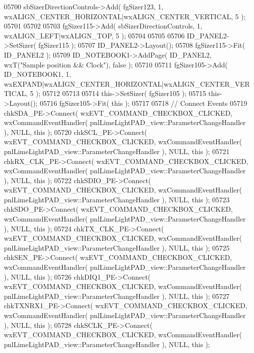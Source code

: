 \begin{DoxyCode}
05700     sbSizerDirectionControls->Add( fgSizer123, 1, wxALIGN\_CENTER\_HORIZONTAL|wxALIGN\_CENTER\_VERTICAL, 5 );
05701     
05702     
05703     fgSizer115->Add( sbSizerDirectionControls, 1, wxALIGN\_LEFT|wxALIGN\_TOP, 5 );
05704     
05705     
05706     ID_PANEL2->SetSizer( fgSizer115 );
05707     ID_PANEL2->Layout();
05708     fgSizer115->Fit( ID_PANEL2 );
05709     ID_NOTEBOOK1->AddPage( ID_PANEL2, wxT(\textcolor{stringliteral}{"Sample position && Clock"}), \textcolor{keyword}{false} );
05710     
05711     fgSizer105->Add( ID_NOTEBOOK1, 1, wxEXPAND|wxALIGN\_CENTER\_HORIZONTAL|wxALIGN\_CENTER\_VERTICAL, 5 );
05712     
05713     
05714     this->SetSizer( fgSizer105 );
05715     this->Layout();
05716     fgSizer105->Fit( \textcolor{keyword}{this} );
05717     
05718     \textcolor{comment}{// Connect Events}
05719     chkSDA_PE->Connect( wxEVT\_COMMAND\_CHECKBOX\_CLICKED, wxCommandEventHandler( 
      pnlLimeLightPAD_view::ParameterChangeHandler ), NULL, \textcolor{keyword}{this} );
05720     chkSCL_PE->Connect( wxEVT\_COMMAND\_CHECKBOX\_CLICKED, wxCommandEventHandler( 
      pnlLimeLightPAD_view::ParameterChangeHandler ), NULL, \textcolor{keyword}{this} );
05721     chkRX_CLK_PE->Connect( wxEVT\_COMMAND\_CHECKBOX\_CLICKED, wxCommandEventHandler( 
      pnlLimeLightPAD_view::ParameterChangeHandler ), NULL, \textcolor{keyword}{this} );
05722     chkSDIO_PE->Connect( wxEVT\_COMMAND\_CHECKBOX\_CLICKED, wxCommandEventHandler( 
      pnlLimeLightPAD_view::ParameterChangeHandler ), NULL, \textcolor{keyword}{this} );
05723     chkSDO_PE->Connect( wxEVT\_COMMAND\_CHECKBOX\_CLICKED, wxCommandEventHandler( 
      pnlLimeLightPAD_view::ParameterChangeHandler ), NULL, \textcolor{keyword}{this} );
05724     chkTX_CLK_PE->Connect( wxEVT\_COMMAND\_CHECKBOX\_CLICKED, wxCommandEventHandler( 
      pnlLimeLightPAD_view::ParameterChangeHandler ), NULL, \textcolor{keyword}{this} );
05725     chkSEN_PE->Connect( wxEVT\_COMMAND\_CHECKBOX\_CLICKED, wxCommandEventHandler( 
      pnlLimeLightPAD_view::ParameterChangeHandler ), NULL, \textcolor{keyword}{this} );
05726     chkDIQ1_PE->Connect( wxEVT\_COMMAND\_CHECKBOX\_CLICKED, wxCommandEventHandler( 
      pnlLimeLightPAD_view::ParameterChangeHandler ), NULL, \textcolor{keyword}{this} );
05727     chkTXNRX1_PE->Connect( wxEVT\_COMMAND\_CHECKBOX\_CLICKED, wxCommandEventHandler( 
      pnlLimeLightPAD_view::ParameterChangeHandler ), NULL, \textcolor{keyword}{this} );
05728     chkSCLK_PE->Connect( wxEVT\_COMMAND\_CHECKBOX\_CLICKED, wxCommandEventHandler( 
      pnlLimeLightPAD_view::ParameterChangeHandler ), NULL, \textcolor{keyword}{this} );

\end{DoxyCode}
